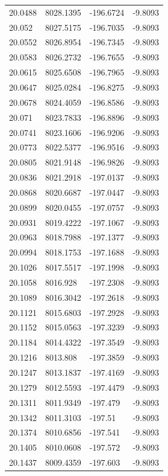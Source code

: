 \begin{table}[H]
\begin{tabular}{llll}
20.0488 & 8028.1395 & -196.6724 & -9.8093 \\
20.052 & 8027.5175 & -196.7035 & -9.8093 \\
20.0552 & 8026.8954 & -196.7345 & -9.8093 \\
20.0583 & 8026.2732 & -196.7655 & -9.8093 \\
20.0615 & 8025.6508 & -196.7965 & -9.8093 \\
20.0647 & 8025.0284 & -196.8275 & -9.8093 \\
20.0678 & 8024.4059 & -196.8586 & -9.8093 \\
20.071 & 8023.7833 & -196.8896 & -9.8093 \\
20.0741 & 8023.1606 & -196.9206 & -9.8093 \\
20.0773 & 8022.5377 & -196.9516 & -9.8093 \\
20.0805 & 8021.9148 & -196.9826 & -9.8093 \\
20.0836 & 8021.2918 & -197.0137 & -9.8093 \\
20.0868 & 8020.6687 & -197.0447 & -9.8093 \\
20.0899 & 8020.0455 & -197.0757 & -9.8093 \\
20.0931 & 8019.4222 & -197.1067 & -9.8093 \\
20.0963 & 8018.7988 & -197.1377 & -9.8093 \\
20.0994 & 8018.1753 & -197.1688 & -9.8093 \\
20.1026 & 8017.5517 & -197.1998 & -9.8093 \\
20.1058 & 8016.928 & -197.2308 & -9.8093 \\
20.1089 & 8016.3042 & -197.2618 & -9.8093 \\
20.1121 & 8015.6803 & -197.2928 & -9.8093 \\
20.1152 & 8015.0563 & -197.3239 & -9.8093 \\
20.1184 & 8014.4322 & -197.3549 & -9.8093 \\
20.1216 & 8013.808 & -197.3859 & -9.8093 \\
20.1247 & 8013.1837 & -197.4169 & -9.8093 \\
20.1279 & 8012.5593 & -197.4479 & -9.8093 \\
20.1311 & 8011.9349 & -197.479 & -9.8093 \\
20.1342 & 8011.3103 & -197.51 & -9.8093 \\
20.1374 & 8010.6856 & -197.541 & -9.8093 \\
20.1405 & 8010.0608 & -197.572 & -9.8093 \\
20.1437 & 8009.4359 & -197.603 & -9.8093 \\

\end{tabular}
\end{table}
